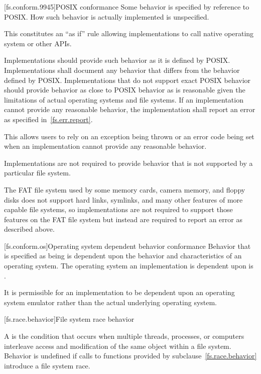 [fs.conform.9945]{POSIX conformance}
\pnum
Some behavior is specified by reference to POSIX. How such behavior is actually implemented is unspecified.
\begin{note}
This constitutes an ``as if'' rule allowing implementations
to call native
operating system or other APIs.
\end{note}

\pnum
Implementations should provide such behavior as it is defined by
POSIX\@. Implementations shall document any behavior that differs from the
behavior defined by POSIX\@. Implementations that do not support exact POSIX
behavior should provide behavior as close to POSIX behavior as is reasonable given the
limitations of actual operating systems and file systems. If an implementation cannot provide any
reasonable behavior, the implementation shall report an error as specified in~\ref{fs.err.report}.
\begin{note}
This allows users to rely on an exception being thrown or
an error code being set when an implementation cannot provide any reasonable
behavior.
\end{note}

\pnum
Implementations are not required to provide behavior that is not supported by
a particular file system.
\begin{example}
The FAT file system used by some memory cards, camera memory, and
floppy disks does not support hard links, symlinks, and many other features of
more capable file systems, so implementations are not required to support those
features on the FAT file system
but instead are required to report an error as described above.
\end{example}

[fs.conform.os]{Operating system dependent behavior conformance}
\pnum
Behavior that is specified as being
is dependent upon the behavior
and characteristics of an operating system.
The operating system an
implementation is dependent upon is
.

\pnum
It is permissible for an implementation to be dependent upon an operating
system emulator rather than the actual underlying operating system.

[fs.race.behavior]{File system race behavior}

\pnum
A  is
the condition that occurs
when multiple threads, processes, or computers interleave access and
modification of
the same object within a file system.
Behavior is undefined if calls to functions provided by subclause~\ref{fs.race.behavior} introduce a file system race.

